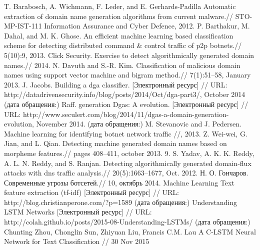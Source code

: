 \begingroup 
\renewcommand{\section}[2]{\anonsection{Библиографический список}}
\begin{thebibliography}{00}
	T. Barabosch, A. Wichmann, F. Leder, and E. Gerhards-Padilla 
    Automatic extraction of domain name generation algorithms from current malware.//
    STO- MP-IST-111 Information Assurance and Cyber Defence, 2012.
    P. Barthakur, M. Dahal, and M. K. Ghose.
    An efficient machine learning based classification scheme for detecting distributed command \& control traffic of p2p botnets.//
    5(10):9, 2013.
    Click Security. Exercise to detect algorithmically generated domain names.//
    2014.
    N. Davuth and S.-R. Kim.
    Classification of malicious domain names using support vector machine and bigram method.//
    7(1):51–58, January 2013.
    J. Jacobs.
    Building a dga classifier.
    [Электронный ресурс] //
    URL: http://datadrivensecurity.info/blog/posts/2014/Oct/dga-part3/, October 2014
    (дата обращения:)
    Raff.
    generation Dgas: A evolution.
    [Электронный ресурс] // 
    URL: http://www.seculert.com/blog/2014/11/dgas-a-domain-generation-evolution, November 2014.
    (дата обращения:)
    M. Stevanovic and J. Pedersen.
    Machine learning for identifying botnet network traffic //, 2013.
    Z. Wei-wei, G. Jian, and L. Qian.
    Detecting machine generated domain names based on morpheme features.//
    pages 408–411, october 2013.
    9. S. Yadav, A. K. K. Reddy, A. L. N. Reddy, and S. Ranjan.
    Detecting algorithmically generated domain-flux attacks with dns traffic analysis.//
    20(5):1663–1677, Oct. 2012.
    Н. О. Гончаров.
    Современные угрозы ботсетей.//
    10, октябрь 2014.
    Machine Learning Text feature extraction (tf-idf)
    [Электронный ресурс] //
    URL: http://blog.christianperone.com/?p=1589
    (дата обращения:)
    Understanding LSTM Networks
    [Электронный ресурс] //
    URL: http://colah.github.io/posts/2015-08-Understanding-LSTMs/
    (дата обращения:)
    Chunting Zhou, Chonglin Sun, Zhiyuan Liu, Francis C.M. Lau
    A C-LSTM Neural Network for Text Classification //
    30 Nov 2015
\end{thebibliography}
\endgroup

\clearpage
